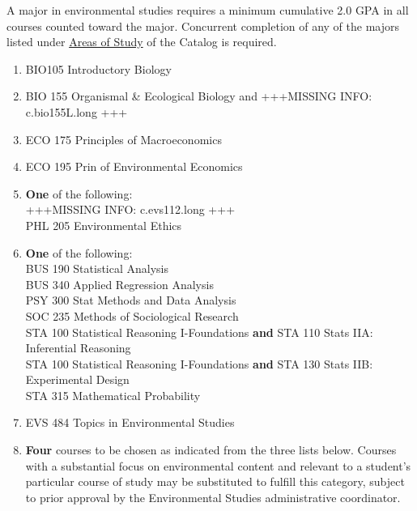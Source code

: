 \documentclass[
  letterpaper,
]{scrbook}
\providecommand{\tightlist}{%
  \setlength{\itemsep}{0pt}\setlength{\parskip}{0pt}}
\begin{document}
A major in environmental studies requires a minimum cumulative 2.0 GPA
in all courses counted toward the major. Concurrent completion of any of
the majors listed under
\hyperref[Areasux5cux2520Ofux5cux2520Study]{Areas of Study} of the
Catalog is required.

\begin{enumerate}
\def\labelenumi{\arabic{enumi}.}
\tightlist
\item
  BIO105 Introductory Biology
\item
  BIO 155 Organismal \& Ecological Biology and +++MISSING INFO:
  c.bio155L.long +++
\item
  ECO 175 Principles of Macroeconomics
\item
  ECO 195 Prin of Environmental Economics
\item
  \textbf{One} of the following:\\
  +++MISSING INFO: c.evs112.long +++\\
  PHL 205 Environmental Ethics\\
\item
  \textbf{One} of the following:\\
  BUS 190 Statistical Analysis\\
  BUS 340 Applied Regression Analysis\\
  PSY 300 Stat Methods and Data Analysis\\
  SOC 235 Methods of Sociological Research\\
  STA 100 Statistical Reasoning I-Foundations \textbf{and} STA 110 Stats
  IIA: Inferential Reasoning\\
  STA 100 Statistical Reasoning I-Foundations \textbf{and} STA 130 Stats
  IIB: Experimental Design\\
  STA 315 Mathematical Probability\\
\item
  EVS 484 Topics in Environmental Studies
\item
  \textbf{Four} courses to be chosen as indicated from the three lists
  below. Courses with a substantial focus on environmental content and
  relevant to a student's particular course of study may be substituted
  to fulfill this category, subject to prior approval by the
  Environmental Studies administrative coordinator.


\end{enumerate}
\end{document}
